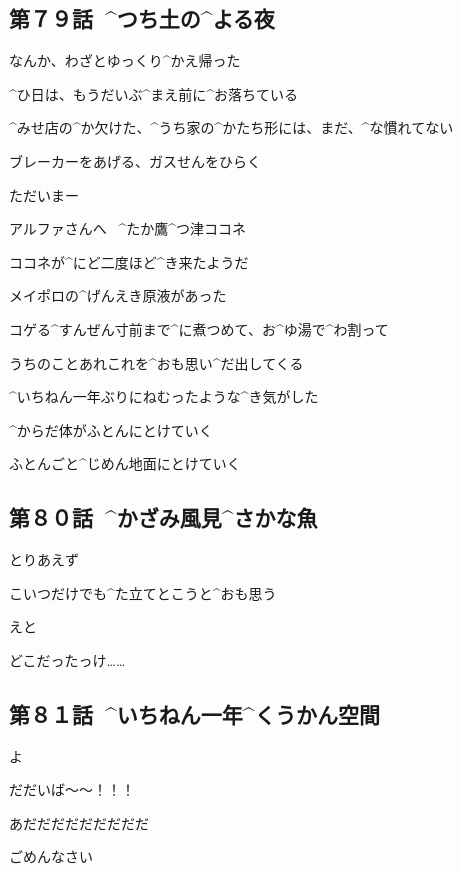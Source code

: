\subsection{第７９話\ ^{つち}{土}の^{よる}{夜}}

\page[30]
\Alpha なんか、わざとゆっくり^{かえ}{帰}った

\page[31]
\Alpha ^{ひ}{日}は、もうだいぶ^{まえ}{前}に^{お}{落}ちている

\page[32]
\Alpha ^{みせ}{店}の^{か}{欠}けた、^{うち}{家}の^{かたち}{形}には、まだ、^{な}{慣}れてない

\page[33]
\Alpha ブレーカーをあげる、ガスせんをひらく

\Alpha ただいまー

\page[34]
\Sign アルファさんへ
\ ^{たか}{鷹}^{つ}{津}ココネ

\page[35]
\Alpha ココネが^{にど}{二度}ほど^{き}{来}たようだ

\page[37]
\Alpha メイポロの^{げんえき}{原液}があった

\Alpha コゲる^{すんぜん}{寸前}まで^{に}{煮}つめて、お^{ゆ}{湯}で^{わ}{割}って

\Alpha うちのことあれこれを^{おも}{思}い^{だ}{出}してくる

\page[41]
\Alpha ^{いちねん}{一年}ぶりにねむったような^{き}{気}がした

\Alpha ^{からだ}{体}がふとんにとけていく

\page[42]
\Alpha ふとんごと^{じめん}{地面}にとけていく


\subsection{第８０話\ ^{かざみ}{風見}^{さかな}{魚}}

\page[46]
\Alpha とりあえず

\page[47]
\Alpha こいつだけでも^{た}{立}てとこうと^{おも}{思}う

\Alpha えと

\Alpha どこだったっけ……


\subsection{第８１話\ ^{いちねん}{一年}^{くうかん}{空間}}

\page[56]
\Ojisan よ

\Alpha だだいば〜〜！！！

\Ojisan あだだだだだだだだだ

\page[57]
\Alpha ごめんなさい

